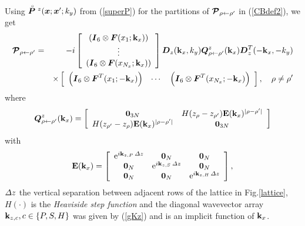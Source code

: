Using $\stackrel{\scriptscriptstyle _{\,\,\circ}}{ \mbox{\boldmath$\mit P$\unboldmath}}{}^{z}({\mbox{\boldmath$\mit x$\unboldmath}};{\mbox{\boldmath$\mit x$\unboldmath}}^{\prime};k_y)$ from 
(\ref{superP}) for the partitions of
${\mbox{\boldmath$\cal P$\unboldmath}}_{\rho \leftarrow   \rho^{\prime}}$ in 
(\ref{CBdef2}), we get
\begin{eqnarray} \label{CBGrhorho1}
{\mbox{\boldmath$\cal P$\unboldmath}}_{ \rho \leftarrow {\rho }^{\prime}}
&=&-i\left[{\begin{array}{c}
\left({\mbox{\boldmath$\mit I$\unboldmath}}_6\otimes 
{\mbox{\boldmath$\mit F$\unboldmath}}(x_1;{\bf k}_{x})  \right)\\ \vdots\\ \left({\mbox{\boldmath$\mit I$\unboldmath}}_6\otimes 
{\mbox{\boldmath$\mit F$\unboldmath}}({x}_{{N}_{x}};{\bf k}_{x})\right)\end{array}}\right]
{\mbox{\boldmath$\mit D$\unboldmath}}_{z}({\bf k}_{x},{k}_{y}) {\mbox{\boldmath$\mit Q$\unboldmath}}_{ \rho 
\leftarrow {\rho }^{\prime}}^{z}({\bf k}_{x})
{\mbox{\boldmath$\mit D$\unboldmath}}^{T}_{z}(-{\bf k}_{x},-{k}_{y})\nonumber\\
&&\times \left[{\begin{array}{ccc}
\left({\mbox{\boldmath$\mit I$\unboldmath}}_6\otimes{\mbox{\boldmath$\mit F$\unboldmath}}^{T}(x_1;-{\bf k}_{x})  \right)&\cdots &
\left({\mbox{\boldmath$\mit I$\unboldmath}}_6\otimes 
{\mbox{\boldmath$\mit F$\unboldmath}}^{T}({x}_{{N}_{x}};-{\bf k}_{x})\right)\end{array}}\right], 
\quad \rho \not= {\rho }^{\prime}
\end{eqnarray} 
where
\begin{equation} \label{Qdefg}
{\mbox{\boldmath$\mit Q$\unboldmath}}^{z}_{\rho\leftarrow {\rho}^{\prime}}({\bf k}_{x})=
\left[{\begin{array}{cc}{\bf 0}_{3N}&H(z_{\rho}-z_{{\rho}^{\prime}}){\bf E}({\bf k}_{x})^{|\rho-{\rho}^{\prime}|}\\
H(z_{{\rho}^{\prime}}-z_{\rho}){\bf E}({\bf k}_{x})^{|\rho-{\rho}^{\prime}|}&{\bf 0}_{3N}\end{array}}\right]
\end{equation}
with
\[
{\bf E}({\bf k}_{x})=\left[{\begin{array}{ccc}
{\rm e}^{i{\bf k}_{z,P}\,{\mit \Delta}z}&{\bf 0}_{N}&{\bf 0}_{N}\\ 
{\bf 0}_{N}&{\rm e}^{ 
i{\bf k}_{z,S}\,{\mit \Delta}z}&{\bf 0}_{N}\\ {\bf 0}_{N}&{\bf 0}_{N}&{\rm e}^{ 
i{\bf k}_{z,H}\,{\mit \Delta}z}\end{array}}\right] ,
\]
${\mit \Delta}z$ the vertical separation between adjacent rows of the 
lattice in Fig.\ref{lattice}, $H(\cdot)$ is the {\em Heaviside step function\/} 
and the diagonal wavevector array ${\bf k}_{z,c}, c\in\{P,S,H  \}$ was 
given by (\ref{gKz}) and is an implicit function of ${\bf k}_{x}$.


